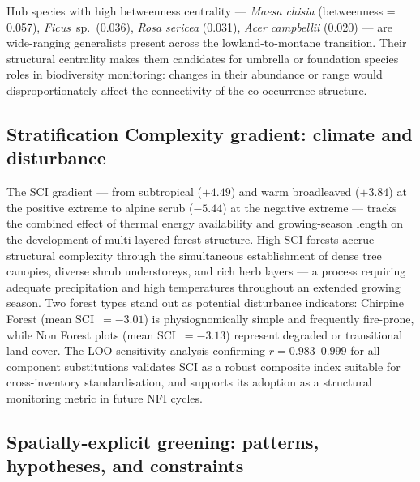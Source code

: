 \documentclass[review,12pt,a4paper]{elsarticle}
\begin{document}
Hub species with high betweenness centrality --- \textit{Maesa chisia}
(betweenness = 0.057), \textit{Ficus}~sp.\ (0.036), \textit{Rosa sericea}
(0.031), \textit{Acer campbellii} (0.020) --- are wide-ranging generalists
present across the lowland-to-montane transition. Their structural centrality
makes them candidates for umbrella or foundation species roles in biodiversity
monitoring: changes in their abundance or range would disproportionately affect
the connectivity of the co-occurrence structure.

\subsection{Stratification Complexity gradient: climate and disturbance}
\label{sec:disc_sci}

The SCI gradient --- from subtropical ($+4.49$) and warm broadleaved ($+3.84$)
at the positive extreme to alpine scrub ($-5.44$) at the negative extreme ---
tracks the combined effect of thermal energy availability and growing-season
length on the development of multi-layered forest structure. High-SCI forests
accrue structural complexity through the simultaneous establishment of dense
tree canopies, diverse shrub understoreys, and rich herb layers --- a process
requiring adequate precipitation and high temperatures throughout an extended
growing season. Two forest types stand out as potential disturbance indicators:
Chirpine Forest (mean SCI~$= -3.01$) is physiognomically simple and
frequently fire-prone, while Non Forest plots (mean SCI~$= -3.13$) represent
degraded or transitional land cover. The LOO sensitivity analysis confirming
$r = 0.983$--$0.999$ for all component substitutions validates SCI as a
robust composite index suitable for cross-inventory standardisation, and
supports its adoption as a structural monitoring metric in future NFI cycles.

\subsection{Spatially-explicit greening: patterns, hypotheses, and constraints}
\label{sec:disc_evi}
\end{document}
